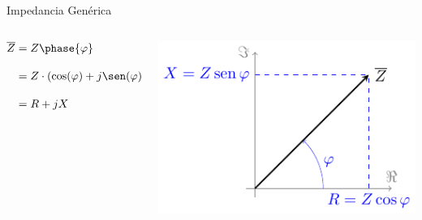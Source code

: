 \documentclass[aspectratio=169, usenames,svgnames,dvipsnames]{beamer}
\begin{document}
\begin{frame}[label={sec:org32a822d}]{Impedancia Genérica}
\begin{columns}
\begin{column}{0.4\columnwidth}
\begin{align*}
  \overline{Z} &= Z\phase{\varphi}\\[10pt]
	       &= Z \cdot (\cos(\varphi) + j\sen(\varphi))\\[10pt]
	       & = R + j X
\end{align*}
\end{column}

\begin{column}{0.6\columnwidth}
\begin{center}
\includegraphics[height=0.6\textheight]{../figs/fasorImpedancia.pdf}
\end{center}
\end{column}
\end{columns}
\end{frame}
\end{document}
